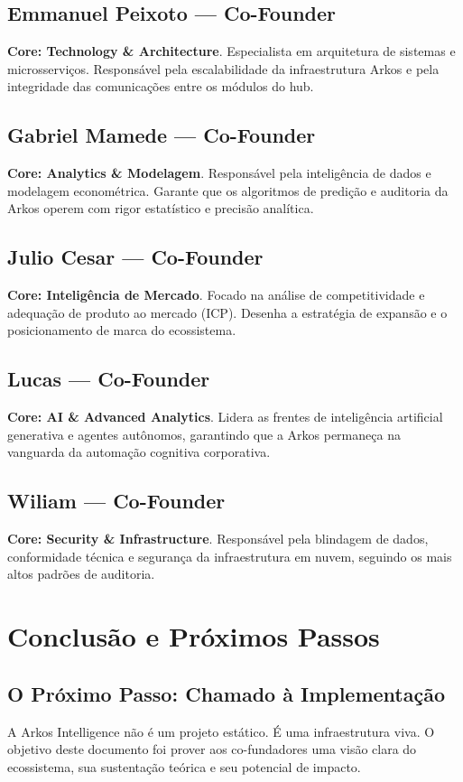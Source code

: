 \documentclass[12pt,a4paper,oneside]{report}
\begin{document}
\section{Emmanuel Peixoto — Co-Founder}
\textbf{Core: Technology \& Architecture}.
Especialista em arquitetura de sistemas e microsserviços. Responsável pela escalabilidade da infraestrutura Arkos e pela integridade das comunicações entre os módulos do hub.

\section{Gabriel Mamede — Co-Founder}
\textbf{Core: Analytics \& Modelagem}.
Responsável pela inteligência de dados e modelagem econométrica. Garante que os algoritmos de predição e auditoria da Arkos operem com rigor estatístico e precisão analítica.

\section{Julio Cesar — Co-Founder}
\textbf{Core: Inteligência de Mercado}.
Focado na análise de competitividade e adequação de produto ao mercado (ICP). Desenha a estratégia de expansão e o posicionamento de marca do ecossistema.

\section{Lucas — Co-Founder}
\textbf{Core: AI \& Advanced Analytics}.
Lidera as frentes de inteligência artificial generativa e agentes autônomos, garantindo que a Arkos permaneça na vanguarda da automação cognitiva corporativa.

\section{Wiliam — Co-Founder}
\textbf{Core: Security \& Infrastructure}.
Responsável pela blindagem de dados, conformidade técnica e segurança da infraestrutura em nuvem, seguindo os mais altos padrões de auditoria.

\pagebreak

\chapter{Conclusão e Próximos Passos}

\section{O Próximo Passo: Chamado à Implementação}
A Arkos Intelligence não é um projeto estático. É uma infraestrutura viva. O objetivo deste documento foi prover aos co-fundadores uma visão clara do ecossistema, sua sustentação teórica e seu potencial de impacto.
\end{document}
